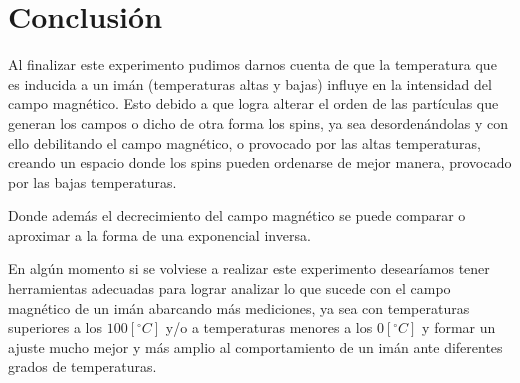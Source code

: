 \section{Conclusión}

Al finalizar este experimento pudimos darnos cuenta de que la temperatura que es inducida a un imán (temperaturas altas y bajas) influye en la intensidad del campo magnético. Esto debido a que logra alterar el orden de las partículas que generan los campos o dicho de otra forma los spins, ya sea desordenándolas y con ello debilitando el campo magnético, o  provocado por las altas temperaturas, creando un espacio donde los spins pueden ordenarse de mejor manera, provocado por las bajas temperaturas.

Donde además el decrecimiento del campo magnético se puede comparar o aproximar a la forma de una exponencial inversa.

En algún momento si se volviese a realizar este experimento desearíamos tener herramientas adecuadas para lograr analizar lo que sucede con el campo magnético de un imán abarcando más mediciones, ya sea con temperaturas superiores a los $100 [^\circ C]$ y/o a temperaturas menores a los $0 [^\circ  C]$ y formar un ajuste mucho mejor y más amplio al comportamiento de un imán ante diferentes grados de temperaturas.


